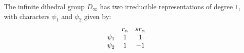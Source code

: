 The infinite dihedral group $D_{\infty}$ has two irreducible representations of degree $1$, with characters $\psi_{1}$ and $\psi_{2}$ given by:
$$
\begin{array}{c c c}
& r_{\alpha} & s r_{\alpha} \\
\psi_{1} & 1 & 1 \\
\psi_{2} & 1 & -1
\end{array}
$$
